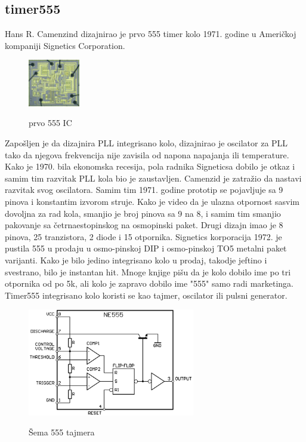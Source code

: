 \documentclass[12pt,a4paper]{article}
\begin{document}
\subsection{timer555}
Hans R. Camenzind dizajnirao je prvo 555 timer kolo 1971. godine u Američkoj kompaniji Signetics Corporation.
\begin{figure}
  \begin{center}
    \includegraphics[width=0.2\textwidth]{555si}
  \end{center}
  \caption{prvo 555 IC}\cite{555W}
\end{figure}
Zapošljen je da dizajnira PLL integrisano kolo, dizajnirao je oscilator za PLL tako da njegova frekvencija nije zavisila od napona napajanja ili temperature. 
Kako je 1970. bila ekonomska recesija, pola radnika Signeticsa dobilo je otkaz i samim tim razvitak PLL kola bio je zaustavljen. 
Camenzid je zatražio da nastavi razvitak svog oscilatora. Samim tim 1971. godine prototip se pojavljuje sa 9 pinova i konstantim izvorom struje. 
Kako je video da je ulazna otpornost sasvim dovoljna za rad kola, smanjio je broj pinova sa 9 na 8, i samim tim smanjio pakovanje sa četrnaestopinskog na osmopinski paket.\cite{555W}
Drugi dizajn imao je 8 pinova, 25 tranzistora, 2 diode i 15 otpornika. Signetics korporacija 1972. je pustila 555 u prodaju u osmo-pinskoj DIP i osmo-pinskoj TO5 metalni paket varijanti. Kako je bilo jedino integrisano kolo u prodaj, takodje jeftino i svestrano, bilo je instantan hit.\cite{555H}
Mnoge knjige pišu da je kolo dobilo ime po tri otpornika od po 5k\ohm, ali kolo je zapravo dobilo ime "555" samo radi marketinga. 
Timer555 integrisano kolo koristi se kao tajmer, oscilator ili pulsni generator.
\begin{figure}[hb]
  \centering
  \includegraphics[width=0.65\textwidth]{555}
  \caption{Šema 555 tajmera}\cite{555W}
\end{figure}
\end{document}
